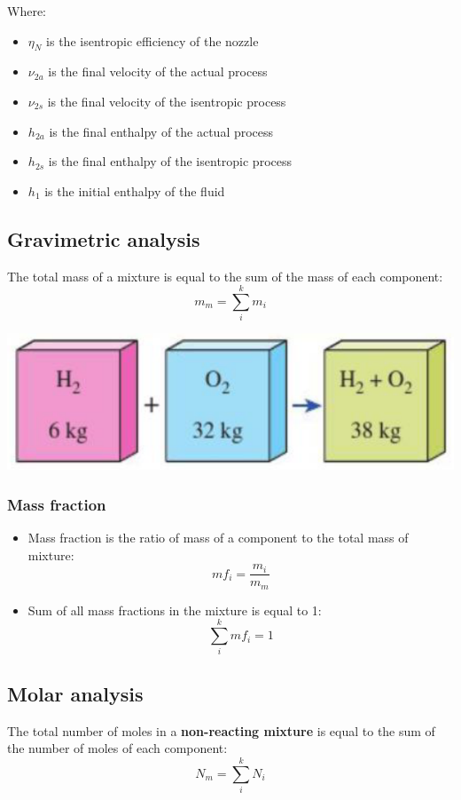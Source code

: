 \documentclass[11pt]{article}
\begin{document}
Where:
\begin{itemize}
\item \(\eta_N\) is the isentropic efficiency of the nozzle
\item \(\nu_{2a}\) is the final velocity of the actual process
\item \(\nu_{2s}\) is the final velocity of the isentropic process
\item \(h_{2a}\) is the final enthalpy of the actual process
\item \(h_{2s}\) is the final enthalpy of the isentropic process
\item \(h_1\) is the initial enthalpy of the fluid
\end{itemize}
\subsection{Gravimetric analysis}
\label{sec:org8ff56f0}
The total mass of a mixture is equal to the sum of the mass of each component:
\[m_m = \sum_i^k m_i\]

\begin{center}
\includegraphics[width=.9\linewidth]{./images/gravimetric-analysis.png}
\end{center}
\subsubsection{Mass fraction}
\label{sec:orgeb6154c}
\begin{itemize}
\item Mass fraction is the ratio of mass of a component to the total mass of mixture:
\[mf_i = \frac{m_i}{m_m}\]
\item Sum of all mass fractions in the mixture is equal to 1:
\[\sum_i^k mf_i = 1\]
\end{itemize}
\subsection{Molar analysis}
\label{sec:org09e4802}
The total number of moles in a \textbf{non-reacting mixture} is equal to the sum of the number of moles of each component:
\[N_m = \sum_i^k N_i\]
\end{document}
